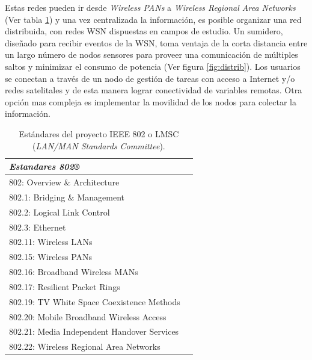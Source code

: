 Estas redes pueden ir desde \textit{Wireless PANs} a \textit{Wireless Regional Area Networks} (Ver tabla \ref{tab:802}) y una vez centralizada la información, es posible organizar una red distribuida, con redes WSN dispuestas en campos de estudio. Un sumidero, diseñado para recibir eventos de la WSN, toma ventaja de la corta distancia entre un largo número de nodos sensores para proveer una comunicación de múltiples saltos y minimizar el consumo de potencia (Ver figura \ref{fig:distrib}). Los usuarios se conectan a través de un nodo de gestión de tareas con acceso a Internet y/o redes satelitales y de esta manera lograr conectividad de variables remotas. Otra opción mas compleja es implementar la movilidad de los nodos para colectar la información.




\begin{table}[ht]
	\centering
	\caption{Estándares del proyecto IEEE 802 o LMSC (\textit{LAN/MAN Standards Committee}).}
	\begin{tabular}{@{} l *1c @{}}    \toprule
		\emph{\textbf{Estandares 802®}} \\
		\midrule
        802: Overview \& Architecture\\
        802.1: Bridging \& Management\\
        802.2: Logical Link Control\\
        802.3: Ethernet\\
        802.11: Wireless LANs\\
        802.15: Wireless PANs\\
        802.16: Broadband Wireless MANs\\
        802.17: Resilient Packet Rings\\
        802.19: TV White Space Coexistence Methods\\
        802.20: Mobile Broadband Wireless Access\\
        802.21: Media Independent Handover Services\\
        802.22: Wireless Regional Area Networks\\
		\bottomrule
		\hline
	\end{tabular}
	\label{tab:802}
\end{table}


